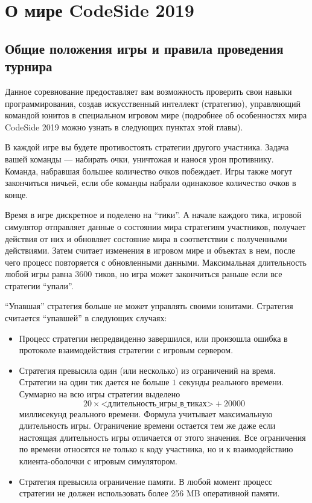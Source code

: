 \chapter{О мире CodeSide 2019}

\section{Общие положения игры и правила проведения турнира}

Данное соревнование предоставляет вам возможность проверить свои навыки программирования,
создав искусственный интеллект (стратегию),
управляющий командой юнитов в специальном игровом мире
(подробнее об особенностях мира CodeSide 2019 можно узнать в следующих пунктах этой главы).

В каждой игре вы будете противостоять стратегии другого участника.
Задача вашей команды --- набирать очки, уничтожая и нанося урон противнику.
Команда, набравшая большее количество очков побеждает.
Игры также могут закончиться ничьей, если обе команды набрали одинаковое количество очков в конце.

Время в игре дискретное и поделено на ``тики''.
А начале каждого тика, игровой симулятор отправляет данные о состоянии мира стратегиям участников,
получает действия от них и обновляет состояние мира в соответствии с полученными действиями.
Затем считает изменения в игровом мире и объектах в нем, после чего процесс повторяется с обновленными данными.
Максимальная длительность любой игры равна $3600$ тиков, но игра может закончиться раньше если все стратегии ``упали''.

``Упавшая'' стратегия больше не может управлять своими юнитами. Стратегия считается ``упавшей'' в следующих случаях:
\begin{itemize}
\item Процесс стратегии непредвиденно завершился,
      или произошла ошибка в протоколе взаимодействия стратегии с игровым сервером.
\item Стратегия превысила один (или несколько) из ограничений на время.
      Стратегии на один тик дается не больше $1$ секунды реального времени.
      Суммарно на всю игры стратегии выделено
      \begin{equation}
      20\times\textit{<длительность\_игры\_в\_тиках>}+20000
      \end{equation}
      миллисекунд реального времени.
      Формула учитывает максимальную длительность игры. Ограничение времени остается тем же даже если
      настоящая длительность игры отличается от этого значения. Все ограничения по времени относятся не только к коду участника,
      но и к взаимодействию клиента-оболочки с игровым симулятором.
\item Стратегия превысила ограничение памяти. В любой момент процесс стратегии не должен использовать более 256 MB оперативной памяти.
\end{itemize}

